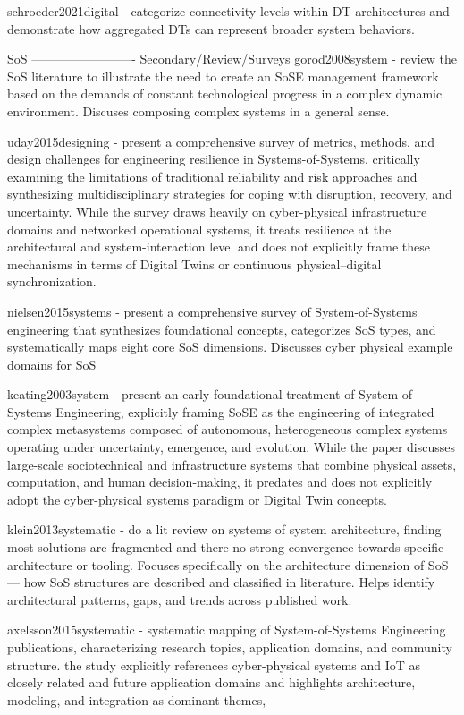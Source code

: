 schroeder2021digital - categorize connectivity levels within DT architectures and demonstrate how aggregated DTs can represent broader system behaviors. 



SoS -------------------------
Secondary/Review/Surveys
gorod2008system - review the SoS literature to illustrate the need to create an SoSE management framework based on the demands of constant technological progress in a complex dynamic environment. Discuses composing complex systems in a general sense. 

uday2015designing - present a comprehensive survey of metrics, methods, and design challenges for engineering resilience in Systems-of-Systems, critically examining the limitations of traditional reliability and risk approaches and synthesizing multidisciplinary strategies for coping with disruption, recovery, and uncertainty. While the survey draws heavily on cyber-physical infrastructure domains and networked operational systems, it treats resilience at the architectural and system-interaction level and does not explicitly frame these mechanisms in terms of Digital Twins or continuous physical–digital synchronization.

nielsen2015systems - present a comprehensive survey of System-of-Systems engineering that synthesizes foundational concepts, categorizes SoS types, and systematically maps eight core SoS dimensions. Discusses cyber physical example domains for SoS 

keating2003system - present an early foundational treatment of System-of-Systems Engineering, explicitly framing SoSE as the engineering of integrated complex metasystems composed of autonomous, heterogeneous complex systems operating under uncertainty, emergence, and evolution. While the paper discusses large-scale sociotechnical and infrastructure systems that combine physical assets, computation, and human decision-making, it predates and does not explicitly adopt the cyber-physical systems paradigm or Digital Twin concepts.

klein2013systematic - do a lit review on systems of system architecture, finding most solutions are fragmented and there no strong convergence towards specific architecture or tooling. Focuses specifically on the architecture dimension of SoS — how SoS structures are described and classified in literature. Helps identify architectural patterns, gaps, and trends across published work.

axelsson2015systematic - systematic mapping of System-of-Systems Engineering publications, characterizing research topics, application domains, and community structure. the study explicitly references cyber-physical systems and IoT as closely related and future application domains and highlights architecture, modeling, and integration as dominant themes,


